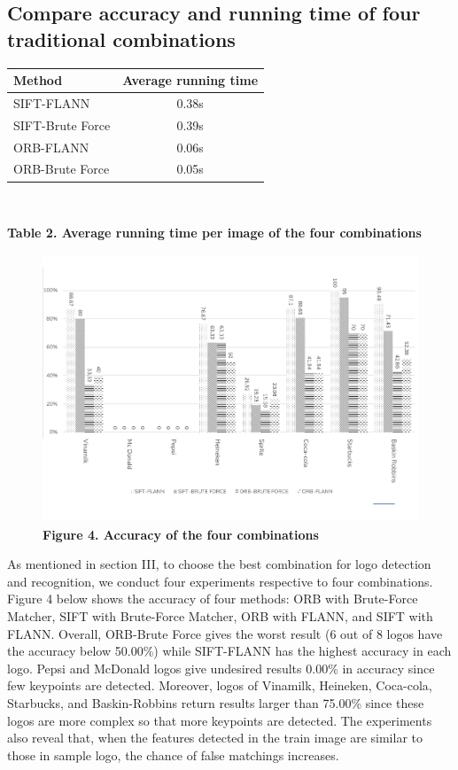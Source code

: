 \documentclass[letterpaper, 10 pt, conference]{ieeeconf}  %
\begin{document}
\subsection{Compare accuracy and running time of four traditional combinations}
\begin{center}
\begin{tabular}{|l|c|}
\hline
Method & Average running time\\ \hline
SIFT-FLANN & 0.38s\\ \hline
SIFT-Brute Force & 0.39s \\ \hline
ORB-FLANN & 0.06s\\ \hline
ORB-Brute Force & 0.05s\\ \hline
\end{tabular}
\\
\end{center}
\begin{center}
\textbf{Table 2. Average running time per image of the four combinations}
\end{center}
\par
\begin{figure}
\centering
\includegraphics[width=15cm, height=8cm]{compareaccuracy.pdf}
\\
\textbf{Figure 4. Accuracy of the four combinations}
\end{figure}
As mentioned in section III, to choose the best combination for logo detection and recognition, we conduct four experiments respective to four combinations. Figure 4 below shows the accuracy of four methods: ORB with Brute-Force Matcher, SIFT with Brute-Force Matcher, ORB with FLANN, and SIFT with FLANN. Overall, ORB-Brute Force gives the worst result (6 out of 8 logos have the accuracy below 50.00\%) while SIFT-FLANN has the highest accuracy in each logo. Pepsi and McDonald logos give undesired results 0.00\% in accuracy since few keypoints are detected. Moreover, logos of Vinamilk, Heineken, Coca-cola, Starbucks, and Baskin-Robbins return results larger than 75.00\% since these logos are more complex so that more keypoints are detected. The experiments also reveal that, when the features detected in the train image are similar to those in sample logo, the chance of false matchings increases.
\end{document}
